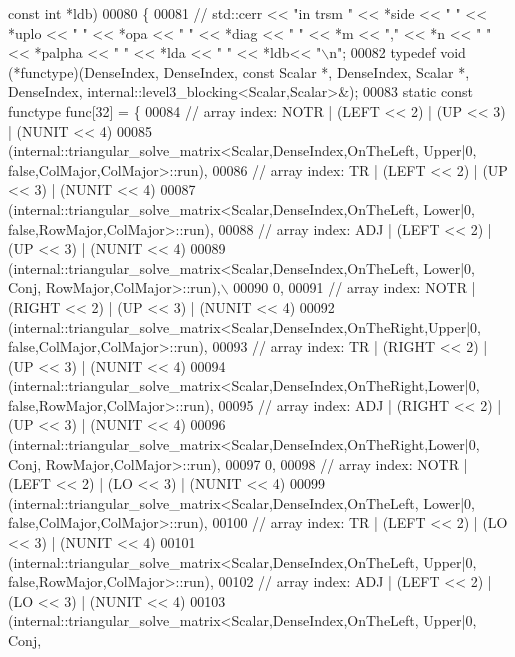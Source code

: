 \begin{DoxyCode}
{      const} \textcolor{keywordtype}{int} *ldb)
00080 \{
00081 \textcolor{comment}{//   std::cerr << "in trsm " << *side << " " << *uplo << " " << *opa << " " << *diag << " " << *m << "," <<
       *n << " " << *palpha << " " << *lda << " " << *ldb<< "\(\backslash\)n";}
00082   \textcolor{keyword}{typedef} void (*functype)(DenseIndex, DenseIndex, \textcolor{keyword}{const} Scalar *, DenseIndex, Scalar *, DenseIndex, 
      internal::level3\_blocking<Scalar,Scalar>&);
00083   \textcolor{keyword}{static} \textcolor{keyword}{const} functype func[32] = \{
00084     \textcolor{comment}{// array index: NOTR  | (LEFT  << 2) | (UP << 3) | (NUNIT << 4)}
00085     (internal::triangular\_solve\_matrix<Scalar,DenseIndex,OnTheLeft, Upper|0,         
       false,ColMajor,ColMajor>::run),
00086     \textcolor{comment}{// array index: TR    | (LEFT  << 2) | (UP << 3) | (NUNIT << 4)}
00087     (internal::triangular\_solve\_matrix<Scalar,DenseIndex,OnTheLeft, Lower|0,         
       false,RowMajor,ColMajor>::run),
00088     \textcolor{comment}{// array index: ADJ   | (LEFT  << 2) | (UP << 3) | (NUNIT << 4)}
00089     (internal::triangular\_solve\_matrix<Scalar,DenseIndex,OnTheLeft, Lower|0,          Conj,
       RowMajor,ColMajor>::run),\(\backslash\)
00090     0,
00091     \textcolor{comment}{// array index: NOTR  | (RIGHT << 2) | (UP << 3) | (NUNIT << 4)}
00092     (internal::triangular\_solve\_matrix<Scalar,DenseIndex,OnTheRight,Upper|0,         
       false,ColMajor,ColMajor>::run),
00093     \textcolor{comment}{// array index: TR    | (RIGHT << 2) | (UP << 3) | (NUNIT << 4)}
00094     (internal::triangular\_solve\_matrix<Scalar,DenseIndex,OnTheRight,Lower|0,         
       false,RowMajor,ColMajor>::run),
00095     \textcolor{comment}{// array index: ADJ   | (RIGHT << 2) | (UP << 3) | (NUNIT << 4)}
00096     (internal::triangular\_solve\_matrix<Scalar,DenseIndex,OnTheRight,Lower|0,          Conj,
       RowMajor,ColMajor>::run),
00097     0,
00098     \textcolor{comment}{// array index: NOTR  | (LEFT  << 2) | (LO << 3) | (NUNIT << 4)}
00099     (internal::triangular\_solve\_matrix<Scalar,DenseIndex,OnTheLeft, Lower|0,         
       false,ColMajor,ColMajor>::run),
00100     \textcolor{comment}{// array index: TR    | (LEFT  << 2) | (LO << 3) | (NUNIT << 4)}
00101     (internal::triangular\_solve\_matrix<Scalar,DenseIndex,OnTheLeft, Upper|0,         
       false,RowMajor,ColMajor>::run),
00102     \textcolor{comment}{// array index: ADJ   | (LEFT  << 2) | (LO << 3) | (NUNIT << 4)}
00103     (internal::triangular\_solve\_matrix<Scalar,DenseIndex,OnTheLeft, Upper|0,          Conj,

\end{DoxyCode}
